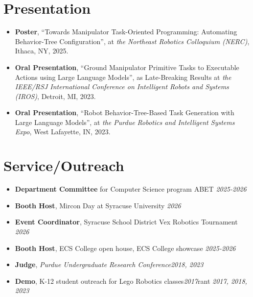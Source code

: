 \documentclass[12pt]{article}
\begin{document}
\section*{Presentation}
\begin{itemize}[leftmargin=1.5em]
\item[] {\bf Poster}, ``Towards Manipulator Task-Oriented Programming: Automating Behavior-Tree Configuration'', at
{\em the Northeast Robotics Colloquium (NERC)}, Ithaca, NY, 2025.
\item[] {\bf Oral Presentation}, ``Ground Manipulator Primitive Tasks to Executable Actions
using Large Language Models'', as Late-Breaking Results at
{\em the IEEE/RSJ International Conference on Intelligent Robots and Systems (IROS)}, Detroit, MI, 2023.
\item[] {\bf Oral Presentation},  ``Robot Behavior-Tree-Based Task Generation with Large Language Models'', at {\em the Purdue Robotics and Intelligent Systems Expo}, West Lafayette, IN, 2023.
\end{itemize}
\vspace{-0.1cm}



\section*{Service/Outreach}
\begin{itemize}[leftmargin=1.5em]
\item[] \textbf{Department Committee} for Computer Science program ABET \hfill {\em 2025-2026} 
\item[] \textbf{Booth Host}, Mircon Day at Syracuse University \hfill {\em 2026} 
\item[] \textbf{Event Coordinator}, Syracuse School District Vex Robotics Tournament \hfill {\em 2026} 
\item[] \textbf{Booth Host}, ECS College open house, ECS College showcase \hfill {\em 2025-2026} 

\item[] {\bf Judge}, {\em Purdue Undergraduate Research Conference}\hfill {\em 2018, 2023} 
\item[] {\bf Demo}, K-12 student outreach for Lego Robotics classes\hfill {\em 2017}rant \hfill {\em 2017, 2018, 2023}
\end{itemize}

\vspace{-0.1cm}
\end{document}
